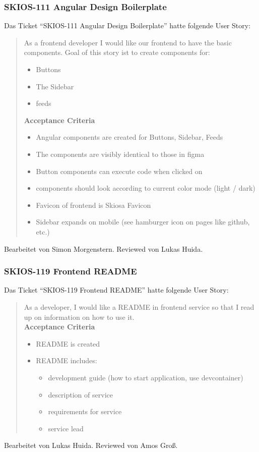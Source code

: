 \subsubsection{SKIOS-111 Angular Design Boilerplate}
Das Ticket \enquote{SKIOS-111 Angular Design Boilerplate} hatte folgende User Story:
\begin{quotation}
    As a frontend developer I would like our frontend to have the basic components.
    Goal of this story ist to create components for:
    \begin{itemize}
        \item Buttons
        \item The Sidebar
        \item feeds
    \end{itemize}
\textbf{Acceptance Criteria}
\begin{itemize}
    \item Angular components are created for Buttons, Sidebar, Feeds
    \item The components are visibly identical to those in figma
    \item Button components can execute code when clicked on
    \item components should look according to current color mode (light / dark)
    \item Favicon of frontend is Skiosa Favicon
    \item Sidebar expands on mobile (see hamburger icon on pages like github, etc.)
\end{itemize}
\end{quotation}
Bearbeitet von Simon Morgenstern.
Reviewed von Lukas Huida.

\subsubsection{SKIOS-119 Frontend README}
Das Ticket \enquote{SKIOS-119 Frontend README} hatte folgende User Story:
\begin{quotation}
    As a developer, I would like a README in frontend service so that I read up on information on how to use it. \\
\textbf{Acceptance Criteria}
\begin{itemize}
    \item README is created
    \item README includes:
    \begin{itemize}
        \item development guide (how to start application, use devcontainer)
        \item description of service
        \item requirements for service
        \item service lead
    \end{itemize}
\end{itemize}
\end{quotation}
Bearbeitet von Lukas Huida.
Reviewed von Amos Groß.

